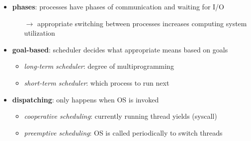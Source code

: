 \begin{summary}
  \begin{itemize}
    \item \textbf{phases}: processes have phases of communication and waiting for I/O
    \begin{itemize}
      \item[$ \to $] appropriate switching between processes increases computing system utilization
    \end{itemize}
    \item \textbf{goal-based}: scheduler decides what appropriate means based on goals
    \begin{itemize}
      \item \emph{long-term scheduler}: degree of multiprogramming
      \item \emph{short-term scheduler}: which process to run next
    \end{itemize}
    \item \textbf{dispatching}: only happens when OS is invoked
    \begin{itemize}
      \item \emph{cooperative scheduling}: currently running thread yields (syscall)
      \item \emph{preemptive scheduling}: OS is called periodically to switch threads
    \end{itemize}
  \end{itemize}
\end{summary}
